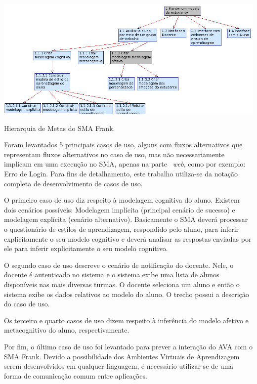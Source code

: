 \begin{table}
	\centering
	\includegraphics[scale=0.8]{images/metas-frank.png}
	\caption{Hierarquia de Metas do SMA Frank.}
	\label{fig:metas-frank}
\end{table}

Foram levantados 5 principais casos de uso, alguns com fluxos alternativos que representam fluxos alternativos no caso de uso, mas não necessariamente implicam em uma execução no SMA, apenas na parte ~\emph{web}, como por exemplo: Erro de Login. Para fins de detalhamento, este trabalho utiliza-se da notação completa de desenvolvimento de casos de uso.

O primeiro caso de uso diz respeito à modelagem cognitiva do aluno. Existem dois cenários possíveis: Modelagem implícita (principal cenário de sucesso) e modelagem explícita (cenário alternativo). Basicamente o SMA deverá processar o questionário de estilos de aprendizagem, respondido pelo aluno, para inferir explicitamente o seu modelo cognitivo e deverá analisar as respostas enviadas por ele para inferir explicitamente o seu modelo cognitivo.

O segundo caso de uso descreve o cenário de notificação do docente. Nele, o docente é autenticado no sistema e o sistema exibe uma lista de alunos disponíveis nas mais diversas turmas. O docente seleciona um aluno e então o sistema exibe os dados relativos ao modelo do aluno. O trecho possui a descrição do caso de uso.

Os terceiro e quarto casos de uso dizem respeito à inferência do modelo afetivo e metacognitivo do aluno, respectivamente.

Por fim, o último caso de uso foi levantado para prever a interação do AVA com o SMA Frank. Devido a possibilidade dos Ambientes Virtuais de Aprendizagem serem desenvolvidos em qualquer linguagem, é necessário utilizar-se de uma forma de comunicação comum entre aplicações.

